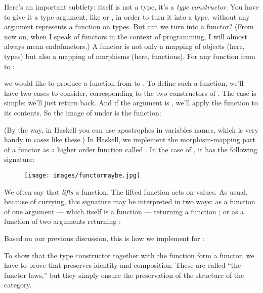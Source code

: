 Here's an important subtlety:  itself is not a type, it's
a \emph{type constructor}. You have to give it a type argument, like
 or , in order to turn it into a type.
 without any argument represents a function on types. But
can we turn  into a functor? (From now on, when I speak of
functors in the context of programming, I will almost always mean
endofunctors.) A functor is not only a mapping of objects (here, types)
but also a mapping of morphisms (here, functions). For any function from
 to :

we would like to produce a function from  to
. To define such a function, we'll have two cases to
consider, corresponding to the two constructors of . The
 case is simple: we'll just return 
back. And if the argument is , we'll apply the function
 to its contents. So the image of  under
 is the function:

(By the way, in Haskell you can use apostrophes in variables names,
which is very handy in cases like these.) In Haskell, we implement the
morphism-mapping part of a functor as a higher order function called
. In the case of , it has the following
signature:


\begin{figure}[H]
  \centering
  \texttt{[image: images/functormaybe.jpg]}
\end{figure}

\noindent
We often say
that  \emph{lifts} a function. The lifted function acts on
 values. As usual, because of currying, this signature may
be interpreted in two ways: as a function of one argument --- which
itself is a function  --- returning a
function ; or as a
function of two arguments returning :

Based on our previous discussion, this is how we implement 
for :

To show that the type constructor  together with the
function  form a functor, we have to prove that
 preserves identity and composition. These are called ``the
functor laws,'' but they simply ensure the preservation of the structure
of the category.

